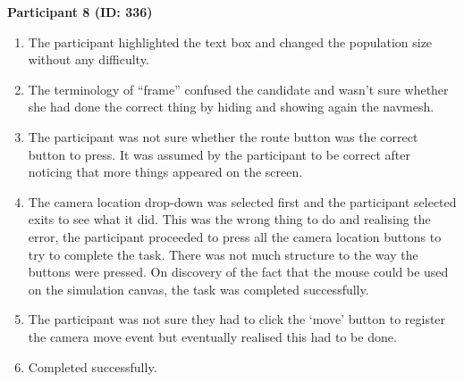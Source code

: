 \textbf{Participant 8 (ID: 336)}
\begin{enumerate}
\item The participant highlighted the text box and changed the population size without any difficulty.
\item The terminology of “frame” confused the candidate and wasn’t sure whether she had done the correct thing by hiding and showing again the navmesh.
\item The participant was not sure whether the route button was the correct button to press. It was assumed by the participant to be correct after noticing that more things appeared on the screen.
\item The camera location drop-down was selected first and the participant selected exits to see what it did. This was the wrong thing to do and realising the error, the participant proceeded to press all the camera location buttons to try to complete the task. There was not much structure to the way the buttons were pressed. On discovery of the fact that the mouse could be used on the simulation canvas, the task was completed successfully.
\item The participant was not sure they had to click the ‘move’ button to register the camera move event but eventually realised this had to be done.
\item Completed successfully.
\end{enumerate}

%
